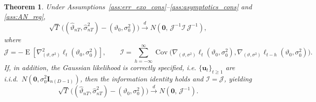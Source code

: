 \documentclass[10pt,a4paper]{amsart}
\newtheorem{theorem}{Theorem}
\DeclareMathOperator{\Cov}{Cov}
\DeclareMathOperator{\E}{E}
\newcommand{\xmat}{\mathbf}
\newcommand{\xvec}{\boldsymbol}
\begin{document}
\begin{theorem}\label{thm:AN}
Under Assumptions~\ref{ass:err_exo_cons}--\ref{ass:asymptotics_cons}
and \ref{ass:AN_reg},
\[
\sqrt{T}\,\big((\hat\vartheta_{nT},\hat\sigma^2_{nT})-(\vartheta_0,\sigma_0^2)\big)
\xrightarrow{d}
N\!\left(\xvec{0},\,\mathcal{J}^{-1}\mathcal{I}\,\mathcal{J}^{-1}\right),
\]
where
\[
\mathcal{J}
=
-\E\!\left[\nabla^2_{(\vartheta,\sigma^2)}\ell_t(\vartheta_0,\sigma_0^2)\right],
\qquad
\mathcal{I}
=
\sum_{h=-\infty}^{\infty}\Cov\!\big(
\nabla_{(\vartheta,\sigma^2)}\ell_t(\vartheta_0,\sigma_0^2),
\nabla_{(\vartheta,\sigma^2)}\ell_{t-h}(\vartheta_0,\sigma_0^2)
\big).
\]
% 
If, in addition, the Gaussian likelihood is correctly specified, i.e.
$\{\xvec{u}_t\}_{t\ge1}$ are i.i.d.\ $N(\xvec{0},\sigma_0^2\xmat{I}_{n(D-1)})$,
then the information identity holds and $\mathcal{I}=\mathcal{J}$, yielding
\[
\sqrt{T}\,\big((\hat\vartheta_{nT},\hat\sigma^2_{nT})-(\vartheta_0,\sigma_0^2)\big)
\xrightarrow{d}
N\!\left(\xvec{0},\,\mathcal{J}^{-1}\right).
\]
\end{theorem}
\end{document}
